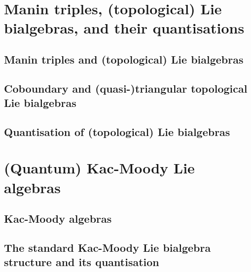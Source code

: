     

    

    \begin{appendices}
        \section{Manin triples, (topological) Lie bialgebras, and their quantisations} 
            \subsection{Manin triples and (topological) Lie bialgebras} \label{subsection: manin_triples}
                

            \subsection{Coboundary and (quasi-)triangular topological Lie bialgebras} \label{subsection: coboundary_and_(quasi)_triangular_topological_lie_bialgebras}
                

            \subsection{Quantisation of (topological) Lie bialgebras}
                
    
        \section{(Quantum) Kac-Moody Lie algebras}
            \subsection{Kac-Moody algebras} \label{subsection: setup_kac_moody_algebras}
                

            \subsection{The standard Kac-Moody Lie bialgebra structure and its quantisation} \label{subsection: setup_standard_kac_moody_lie_bialgebras}
                

                
    \end{appendices}
	
    \printbibliography

